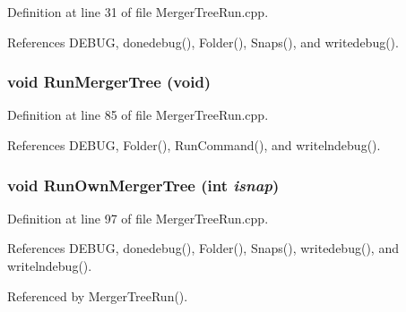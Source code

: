 Definition at line 31 of file MergerTreeRun.cpp.



References DEBUG, donedebug(), Folder(), Snaps(), and writedebug().

\subsubsection[{RunMergerTree}]{\setlength{\rightskip}{0pt plus 5cm}void RunMergerTree (void)}\label{MergerTreeRun_8cpp_a249560c73bf9e02187d6acad63254713}


Definition at line 85 of file MergerTreeRun.cpp.



References DEBUG, Folder(), RunCommand(), and writelndebug().

\subsubsection[{RunOwnMergerTree}]{\setlength{\rightskip}{0pt plus 5cm}void RunOwnMergerTree (int {\em isnap})}\label{MergerTreeRun_8cpp_abf85a822012ed8b72d6fb3e7a7f12b09}


Definition at line 97 of file MergerTreeRun.cpp.



References DEBUG, donedebug(), Folder(), Snaps(), writedebug(), and writelndebug().



Referenced by MergerTreeRun().

